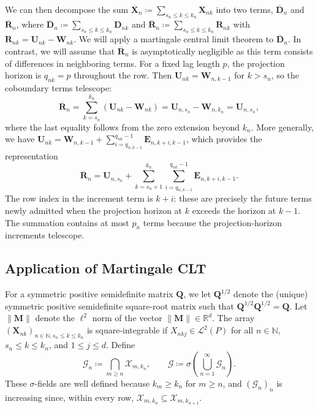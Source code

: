 \documentclass[11pt]{article}
\renewcommand\vec[1]{\boldsymbol{#1}}
\newcommand\mat[1]{\mathbf{#1}}
\newcommand{\R}{\mathbb{R}}
\newcommand{\N}{\mathbb{N}}
\newcommand{\G}{\mathcal{G}}
\newcommand{\X}{\mathcal{X}}
\renewcommand{\L}{\mathcal{L}}
\theoremstyle{definition}
\begin{document}
We can then decompose the sum $\overline{\vec{X}}_n \coloneqq \sum_{s_n \leq k \leq k_n} \vec{X}_{nk}$ into two terms, $\overline{\vec{D}}_n$ and $\overline{\vec{R}}_n$, where $\overline{\vec{D}}_n \coloneqq \sum_{s_n \leq k \leq k_n} \vec{D}_{nk}$ and $\overline{\vec{R}}_n \coloneqq \sum_{s_n \leq k \leq k_n} \vec{R}_{nk}$ with $\vec{R}_{nk} = \vec{U}_{nk} - \vec{W}_{nk}$.
We will apply a martingale central limit theorem to $\overline{\vec{D}}_n$.
In contrast, we will assume that $\overline{\vec{R}}_n$ is asymptotically negligible as this term consists of differences in neighboring terms.
For a fixed lag length \(p\), the projection horizon is \(q_{nk}=p\) throughout the row.
Then \(\vec{U}_{nk}=\vec{W}_{n,k-1}\) for \(k>s_n\), so the coboundary terms telescope:
\[
\overline{\vec{R}}_n
=
\sum_{k=s_n}^{k_n}(\vec U_{nk}-\vec W_{nk})
=
\vec U_{n,s_n}-\vec W_{n,k_n}
=
\vec U_{n,s_n},
\]
where the last equality follows from the zero extension beyond \(k_n\).
More generally, we have $\vec{U}_{nk} = \vec{W}_{n,k-1} + \sum_{i=q_{n,k-1}}^{q_{nk}-1} \vec{E}_{n,k+i,k-1}$, which provides the representation
\begin{equation}\label{eq:R-bar-remainder}
\overline{\vec{R}}_n
=
\vec{U}_{n,s_n}
+
\sum_{k=s_n+1}^{k_n}
\sum_{i=q_{n,k-1}}^{q_{nk}-1}
\vec{E}_{n,k+i,k-1}.
\end{equation}
The row index in the increment term is \(k+i\): these are precisely the future terms newly admitted when the projection horizon at \(k\) exceeds the horizon at \(k-1\).
The summation contains at most \(p_n\) terms because the projection-horizon increments telescope.

\subsection{Application of Martingale CLT}\label{sec:martingale-clt}

For a symmetric positive semidefinite matrix $\mat{Q}$, we let $\mat{Q}^{1/2}$ denote the (unique) symmetric positive semidefinite square-root matrix such that $\mat{Q}^{1/2} \mat{Q}^{1/2} = \mat{Q}$.
Let $\|\vec{M}\|$ denote the $\ell^2$ norm of the vector $\|\vec{M}\| \in \R^d$.
The array $(\vec{X}_{nk})_{n \in \N, s_n \leq k \leq k_n}$ is square-integrable if $X_{nkj} \in \L^2(P)$ for all $n \in \N$, $s_n \leq k \leq k_n$, and $1 \leq j \leq d$.
Define
\[
\G_n\coloneqq\bigcap_{m\geq n}\X_{m,k_n},
\qquad
\G\coloneqq\sigma\left(\bigcup_{n=1}^{\infty}\G_n\right).
\]
These $\sigma$-fields are well defined because \(k_m\geq k_n\) for \(m\geq n\), and \((\G_n)_n\) is increasing since, within every row, \(\X_{m,k_n}\subseteq\X_{m,k_{n+1}}\).
\end{document}
